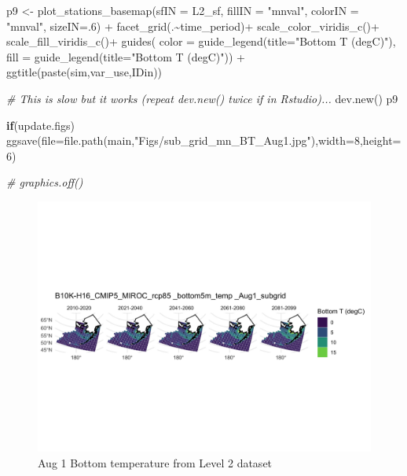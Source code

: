 \documentclass[
]{article}
\newenvironment{Shaded}{\begin{snugshade}}{\end{snugshade}}
\newcommand{\AttributeTok}[1]{\textcolor[rgb]{0.77,0.63,0.00}{#1}}
\newcommand{\CommentTok}[1]{\textcolor[rgb]{0.56,0.35,0.01}{\textit{#1}}}
\newcommand{\ControlFlowTok}[1]{\textcolor[rgb]{0.13,0.29,0.53}{\textbf{#1}}}
\newcommand{\DecValTok}[1]{\textcolor[rgb]{0.00,0.00,0.81}{#1}}
\newcommand{\FunctionTok}[1]{\textcolor[rgb]{0.00,0.00,0.00}{#1}}
\newcommand{\NormalTok}[1]{#1}
\newcommand{\OtherTok}[1]{\textcolor[rgb]{0.56,0.35,0.01}{#1}}
\newcommand{\SpecialCharTok}[1]{\textcolor[rgb]{0.00,0.00,0.00}{#1}}
\newcommand{\StringTok}[1]{\textcolor[rgb]{0.31,0.60,0.02}{#1}}
\begin{document}
\begin{Shaded}
\begin{Highlighting}[]
\NormalTok{    p9     }\OtherTok{\textless{}{-}} \FunctionTok{plot\_stations\_basemap}\NormalTok{(}\AttributeTok{sfIN =}\NormalTok{ L2\_sf,}
                                \AttributeTok{fillIN =} \StringTok{"mnval"}\NormalTok{,}
                                \AttributeTok{colorIN =} \StringTok{"mnval"}\NormalTok{,}
                                \AttributeTok{sizeIN=}\NormalTok{.}\DecValTok{6}\NormalTok{) }\SpecialCharTok{+}
      \FunctionTok{facet\_grid}\NormalTok{(.}\SpecialCharTok{\textasciitilde{}}\NormalTok{time\_period)}\SpecialCharTok{+}
      \FunctionTok{scale\_color\_viridis\_c}\NormalTok{()}\SpecialCharTok{+}
      \FunctionTok{scale\_fill\_viridis\_c}\NormalTok{()}\SpecialCharTok{+}
      \FunctionTok{guides}\NormalTok{(}
        \AttributeTok{color =}  \FunctionTok{guide\_legend}\NormalTok{(}\AttributeTok{title=}\StringTok{"Bottom T (degC)"}\NormalTok{),}
        \AttributeTok{fill  =}  \FunctionTok{guide\_legend}\NormalTok{(}\AttributeTok{title=}\StringTok{"Bottom T (degC)"}\NormalTok{)) }\SpecialCharTok{+}
      \FunctionTok{ggtitle}\NormalTok{(}\FunctionTok{paste}\NormalTok{(sim,var\_use,IDin))}
   
    \CommentTok{\# This is slow but it works (repeat dev.new() twice if in Rstudio)...}
    \FunctionTok{dev.new}\NormalTok{()}
\NormalTok{    p9}
    
    \ControlFlowTok{if}\NormalTok{(update.figs)  }
      \FunctionTok{ggsave}\NormalTok{(}\AttributeTok{file=}\FunctionTok{file.path}\NormalTok{(main,}\StringTok{"Figs/sub\_grid\_mn\_BT\_Aug1.jpg"}\NormalTok{),}\AttributeTok{width=}\DecValTok{8}\NormalTok{,}\AttributeTok{height=}\DecValTok{6}\NormalTok{)}
  
    \CommentTok{\# graphics.off()}
\end{Highlighting}
\end{Shaded}

\begin{figure}
\centering
\includegraphics[width=1\textwidth,height=\textheight]{Figs/sub_grid_mn_BT_Aug1.jpg}
\caption{Aug 1 Bottom temperature from Level 2 dataset}
\end{figure}
\end{document}
